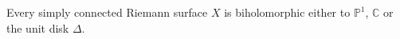\documentclass[12pt]{article}
\begin{document}
Every simply connected Riemann surface $X$ is biholomorphic either to $\mathbb P^1$, $\mathbb C$ or the unit disk $\Delta$.
\end{document}
